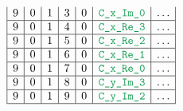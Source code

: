 \begin{figure}[h!]
\begin{adjustwidth}{-2cm}{-2cm}
{\[\begin{array}{|c|c|c|c|c|c|c|}
                    9                      & 0                                       & 1                                         & 3                      & 0                   & \locCXImZero  & \hdots                                                                                                                                                            \\ \hline
                    9                      & 0                                       & 1                                         & 4                      & 0                   & \locCXReThree & \hdots                                                                                                                                                            \\ \hline
                    9                      & 0                                       & 1                                         & 5                      & 0                   & \locCXReTwo   & \hdots                                                                                                                                                            \\ \hline
                    9                      & 0                                       & 1                                         & 6                      & 0                   & \locCXReOne   & \hdots                                                                                                                                                            \\ \hline
                    9                      & 0                                       & 1                                         & 7                      & 0                   & \locCXReZero  & \hdots                                                                                                                                                            \\ \hline
                    9                      & 0                                       & 1                                         & 8                      & 0                   & \locCYImThree & \hdots                                                                                                                                                            \\ \hline
                    9                      & 0                                       & 1                                         & 9                      & 0                   & \locCYImTwo   & \hdots                                                                                                                                                            \\ \hline

\end{array}\]}
\end{adjustwidth}
\end{figure}
